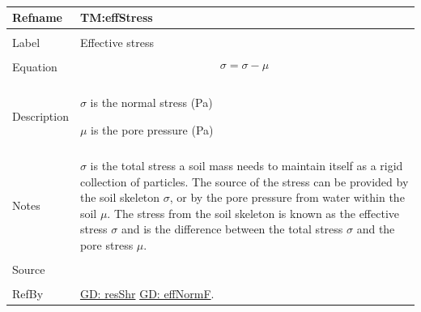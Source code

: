 \documentclass[12pt]{article}
\begin{document}
~\newline
 \noindent \begin{minipage}{\textwidth}
\begin{tabular}{p{} p{}}
\toprule \textbf{Refname} & \textbf{TM:effStress}
\label{TM:effStress}
\\ \midrule \\
Label & Effective stress
        \\ \midrule \\
        Equation & \begin{displaymath}
                   σ=σ-μ
                   \end{displaymath}
                   \\ \midrule \\
                   Description & \begin{symbDescription}
                                 \item{$σ$ is the normal stress (Pa)}
                                 \item{$μ$ is the pore pressure (Pa)}
                                 \end{symbDescription}
                                 \\ \midrule \\
                                 Notes & $σ$ is the total stress a soil mass needs to maintain itself as a rigid collection of particles. The source of the stress can be provided by the soil skeleton $σ$, or by the pore pressure from water within the soil $μ$. The stress from the soil skeleton is known as the effective stress $σ$ and is the difference between the total stress $σ$ and the pore stress $μ$.
                                         \\ \midrule \\
                                         Source & \cite{fredlund1977}
                                                  \\ \midrule \\
                                                  RefBy & \hyperref[GD:resShr]{GD: resShr} \hyperref[GD:effNormF]{GD: effNormF}.
\\ \bottomrule \end{tabular}
\end{minipage}\\
\end{document}
